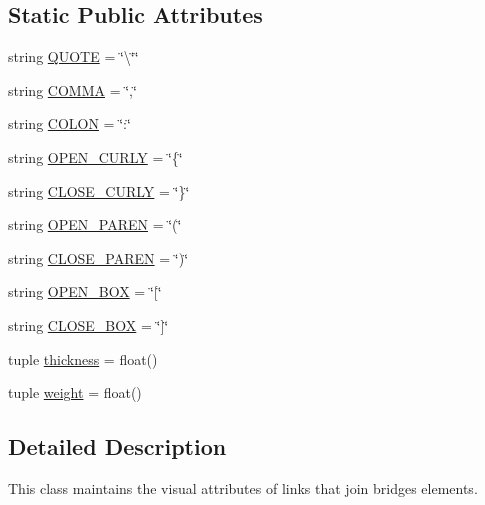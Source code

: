 \subsection*{Static Public Attributes}
\begin{DoxyCompactItemize}
\item 
string \hyperlink{classbridges_1_1link__visualizer_1_1_link_visualizer_a712237d5800a6b74d88d8381200c2272}{Q\+U\+O\+T\+E} = \char`\"{}\textbackslash{}\char`\"{}\char`\"{}
\item 
string \hyperlink{classbridges_1_1link__visualizer_1_1_link_visualizer_ac5d0d144c14ef4a251f8973f646582f1}{C\+O\+M\+M\+A} = \char`\"{},\char`\"{}
\item 
string \hyperlink{classbridges_1_1link__visualizer_1_1_link_visualizer_ad16a767b45a5a602abd761564036e134}{C\+O\+L\+O\+N} = \char`\"{}\+:\char`\"{}
\item 
string \hyperlink{classbridges_1_1link__visualizer_1_1_link_visualizer_a6790d62624972a8055b4bad7d92d69db}{O\+P\+E\+N\+\_\+\+C\+U\+R\+L\+Y} = \char`\"{}\{\char`\"{}
\item 
string \hyperlink{classbridges_1_1link__visualizer_1_1_link_visualizer_a7bda0dc57fd93268422a36c691758728}{C\+L\+O\+S\+E\+\_\+\+C\+U\+R\+L\+Y} = \char`\"{}\}\char`\"{}
\item 
string \hyperlink{classbridges_1_1link__visualizer_1_1_link_visualizer_a78c2d36eaaa6edb44f66715eb0697afa}{O\+P\+E\+N\+\_\+\+P\+A\+R\+E\+N} = \char`\"{}(\char`\"{}
\item 
string \hyperlink{classbridges_1_1link__visualizer_1_1_link_visualizer_a04bc23c6c778e17342e7799b00838971}{C\+L\+O\+S\+E\+\_\+\+P\+A\+R\+E\+N} = \char`\"{})\char`\"{}
\item 
string \hyperlink{classbridges_1_1link__visualizer_1_1_link_visualizer_a5919c9fdb97532cd3a53bc09b1108223}{O\+P\+E\+N\+\_\+\+B\+O\+X} = \char`\"{}\mbox{[}\char`\"{}
\item 
string \hyperlink{classbridges_1_1link__visualizer_1_1_link_visualizer_a158c68d40d819a93692ecf53ba7a6a61}{C\+L\+O\+S\+E\+\_\+\+B\+O\+X} = \char`\"{}\mbox{]}\char`\"{}
\item 
tuple \hyperlink{classbridges_1_1link__visualizer_1_1_link_visualizer_aeef90953eea48a6148bae9c5c5f51901}{thickness} = float()
\item 
tuple \hyperlink{classbridges_1_1link__visualizer_1_1_link_visualizer_a58ffed15d53e1f7c2414436f9d063b80}{weight} = float()
\end{DoxyCompactItemize}


\subsection{Detailed Description}
This class maintains the visual attributes of links that join bridges elements. 

